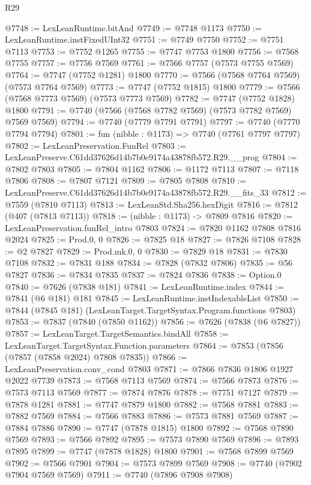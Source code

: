 \begin{lexlean}{R29}
\begin{coremodule}
@7748 := LexLeanRuntime.bitAnd
@7749 := @7748 @1173
@7750 := LexLeanRuntime.instFixedUInt32
@7751 := @7749 @7750
@7752 := @7751 @7113
@7753 := @7752 @1265
@7755 := @7747 @7753 @1800
@7756 := @7568 @7755
@7757 := @7756 @7569
@7761 := @7566 @7757 (@7573 @7755 @7569)
@7764 := @7747 (@7752 @1281) @1800
@7770 := @7566 (@7568 @7764 @7569) (@7573 @7764 @7569)
@7773 := @7747 (@7752 @1815) @1800
@7779 := @7566 (@7568 @7773 @7569) (@7573 @7773 @7569)
@7782 := @7747 (@7752 @1828) @1800
@7791 := @7740 (@7566 (@7568 @7782 @7569) (@7573 @7782 @7569) @7569 @7569)
@7794 := @7740 (@7779 @7791 @7791)
@7797 := @7740 (@7770 @7794 @7794)
@7801 := fun (nibble : @1173) => @7740 (@7761 @7797 @7797)
@7802 := LexLeanPreservation.FunRel
@7803 := LexLeanPreserve.C61dd37626d14b7b0e9174a43878fb572.R29.__prog
@7804 := @7802 @7803
@7805 := @7804 @1162
@7806 := @1172 @7113
@7807 := @7118 @7806
@7808 := @7807 @7121
@7809 := @7805 @7808
@7810 := LexLeanPreserve.C61dd37626d14b7b0e9174a43878fb572.R29.__fits_33
@7812 := @7559 (@7810 @7113)
@7813 := LexLeanStd.Sha256.hexDigit
@7816 := @7812 (@407 (@7813 @7113))
@7818 := (nibble : @1173) -> @7809 @7816
@7820 := LexLeanPreservation.funRel_intro @7803
@7824 := @7820 @1162 @7808 @7816 @2024
@7825 := Prod.{0, 0}
@7826 := @7825 @18
@7827 := @7826 @7108
@7828 := @2 @7827
@7829 := Prod.mk.{0, 0}
@7830 := @7829 @18
@7831 := @7830 @7108
@7832 := @7831 @188
@7834 := @7828 (@7832 @7806)
@7835 := @56 @7827
@7836 := @7834 @7835
@7837 := @7824 @7836
@7838 := Option.{0}
@7840 := @7626 (@7838 @181)
@7841 := LexLeanRuntime.index
@7844 := @7841 (@6 @181) @181
@7845 := LexLeanRuntime.instIndexableList
@7850 := @7844 (@7845 @181) (LexLeanTarget.TargetSyntax.Program.functions @7803)
@7853 := @7837 (@7840 (@7850 @1162))
@7856 := @7626 (@7838 (@6 @7827))
@7857 := LexLeanTarget.TargetSemantics.bindAll
@7858 := LexLeanTarget.TargetSyntax.Function.parameters
@7864 := @7853 (@7856 (@7857 (@7858 @2024) @7808 @7835))
@7866 := LexLeanPreservation.conv_cond @7803
@7871 := @7866 @7836 @1806 @1927 @2022 @7739
@7873 := @7568 @7113 @7569
@7874 := @7566 @7873
@7876 := @7573 @7113 @7569
@7877 := @7874 @7876
@7878 := @7751 @7127
@7879 := @7878 @1281
@7881 := @7747 @7879 @1800
@7882 := @7568 @7881
@7883 := @7882 @7569
@7884 := @7566 @7883
@7886 := @7573 @7881 @7569
@7887 := @7884 @7886
@7890 := @7747 (@7878 @1815) @1800
@7892 := @7568 @7890 @7569
@7893 := @7566 @7892
@7895 := @7573 @7890 @7569
@7896 := @7893 @7895
@7899 := @7747 (@7878 @1828) @1800
@7901 := @7568 @7899 @7569
@7902 := @7566 @7901
@7904 := @7573 @7899 @7569
@7908 := @7740 (@7902 @7904 @7569 @7569)
@7911 := @7740 (@7896 @7908 @7908)

\end{coremodule}
\end{lexlean}
